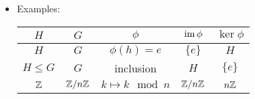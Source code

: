 \documentclass[../notes.tex]{subfiles}
\begin{document}
\begin{itemize}
\begin{proof}
        Claim 1: We know that $\phi(e_H)=e_G$, so
        \begin{equation*}
            \im\phi \neq \emptyset
        \end{equation*}
        as desired. Next, let $g_1,g_2\in\im\phi$. Suppose $g_1=\phi(h_1)$ and $g_2=\phi(h_2)$. Then since $H$ is closed under multiplication as a subgroup, $h_1h_2\in H$. It follows that
        \begin{equation*}
            g_1g_2 = \phi(h_1)\phi(h_2)
            = \phi(h_1h_2)
            \in \im\phi
        \end{equation*}
        as desired. Lastly, let $g\in\im\phi$. Suppose $g=\phi(h)$. Then since $H$ is closed under inverses as a subgroup, $h^{-1}\in H$. It follows that
        \begin{equation*}
            g^{-1} = \phi(h)^{-1}
            = \phi(h^{-1})
            \in \im\phi
        \end{equation*}
        as desired.\par
        Claim 2: We know that $\phi(e_H)=e_G$, so
        \begin{equation*}
            \ker\phi \neq \emptyset
        \end{equation*}
        as desired. Next, let $g_1,g_2\in\ker\phi$. Then
        \begin{equation*}
            e_G = e_Ge_G
            = \phi(g_1)\phi(g_2)
            = \phi(g_1g_2)
        \end{equation*}
        so $g_1g_2\in\ker\phi$, as desired. Lastly, let $g\in\ker\phi$. Then
        \begin{equation*}
            e_G = \phi(e_H)
            = \phi(gg^{-1})
            = \phi(g)\phi(g^{-1})
            = e_G\phi(g^{-1})
            = \phi(g^{-1})
        \end{equation*}
    \end{proof}
    \item Examples:
    \begin{table}[h!]
        \centering
        \small
        \renewcommand{\arraystretch}{1.2}
        \begin{tabular}{c|c|c|c|c}
            $H$ & $G$ & $\phi$ & $\operatorname{im}\phi$ & $\ker\phi$\\
            \hline
            $H$ & $G$ & $\phi(h)=e$ & $\{e\}$ & $H$\\
            $H\leq G$ & $G$ & inclusion & $H$ & $\{e\}$\\
            $\mathbb{Z}$ & $\mathbb{Z}/n\mathbb{Z}$ & $k\mapsto k\mod n$ & $\mathbb{Z}/n\mathbb{Z}$ & $n\mathbb{Z}$\\

\end{tabular}
\end{table}
\end{itemize}
\end{document}
